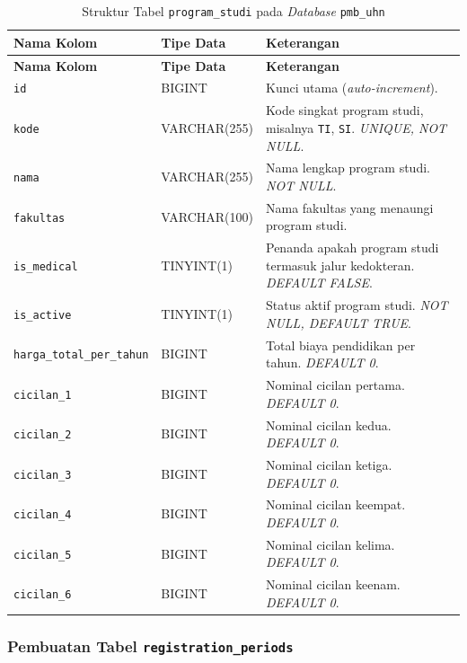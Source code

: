 \begin{longtable}{|L{0.30\textwidth}|L{0.18\textwidth}|L{0.38\textwidth}|}
	\caption{Struktur Tabel \texttt{program\_studi} pada \textit{Database} \texttt{pmb\_uhn}}
	\label{fig:4.db.prodi}\\
	\hline
	\textbf{Nama Kolom} & \textbf{Tipe Data} & \textbf{Keterangan} \\
	\hline
	\endfirsthead
	\hline
	\textbf{Nama Kolom} & \textbf{Tipe Data} & \textbf{Keterangan} \\
	\hline
	\endhead
	\texttt{id} & BIGINT & Kunci utama (\textit{auto-increment}). \\
	\hline
	\texttt{kode} & VARCHAR(255) & Kode singkat program studi, misalnya \texttt{TI}, \texttt{SI}. \textit{UNIQUE, NOT NULL}. \\
	\hline
	\texttt{nama} & VARCHAR(255) & Nama lengkap program studi. \textit{NOT NULL}. \\
	\hline
	\texttt{fakultas} & VARCHAR(100) & Nama fakultas yang menaungi program studi. \\
	\hline
	\texttt{is\_medical} & TINYINT(1) & Penanda apakah program studi termasuk jalur kedokteran. \textit{DEFAULT FALSE}. \\
	\hline
	\texttt{is\_active} & TINYINT(1) & Status aktif program studi. \textit{NOT NULL, DEFAULT TRUE}. \\
	\hline
	\texttt{harga\_total\_per\_tahun} & BIGINT & Total biaya pendidikan per tahun. \textit{DEFAULT 0}. \\
	\hline
	\texttt{cicilan\_1} & BIGINT & Nominal cicilan pertama. \textit{DEFAULT 0}. \\
	\hline
	\texttt{cicilan\_2} & BIGINT & Nominal cicilan kedua. \textit{DEFAULT 0}. \\
	\hline
	\texttt{cicilan\_3} & BIGINT & Nominal cicilan ketiga. \textit{DEFAULT 0}. \\
	\hline
	\texttt{cicilan\_4} & BIGINT & Nominal cicilan keempat. \textit{DEFAULT 0}. \\
	\hline
	\texttt{cicilan\_5} & BIGINT & Nominal cicilan kelima. \textit{DEFAULT 0}. \\
	\hline
	\texttt{cicilan\_6} & BIGINT & Nominal cicilan keenam. \textit{DEFAULT 0}. \\
	\hline
\end{longtable}

\subsubsection{Pembuatan Tabel \texttt{registration\_periods}} \label{IV.DB.RegPeriod}

